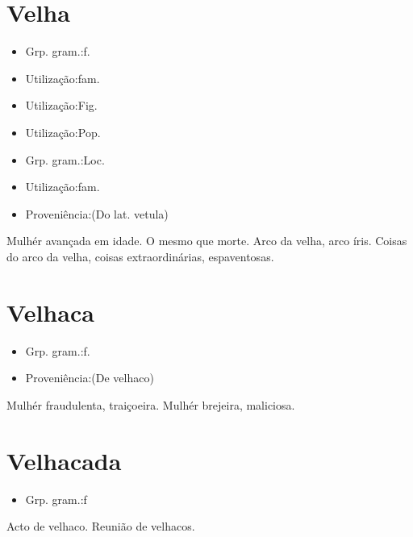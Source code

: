\documentclass{article}
\begin{document}
\section{Velha}
\begin{itemize}
\item {Grp. gram.:f.}
\end{itemize}
\begin{itemize}
\item {Utilização:fam.}
\end{itemize}
\begin{itemize}
\item {Utilização:Fig.}
\end{itemize}
\begin{itemize}
\item {Utilização:Pop.}
\end{itemize}
\begin{itemize}
\item {Grp. gram.:Loc.}
\end{itemize}
\begin{itemize}
\item {Utilização:fam.}
\end{itemize}
\begin{itemize}
\item {Proveniência:(Do lat. \textunderscore vetula\textunderscore )}
\end{itemize}
Mulhér avançada em idade.
O mesmo que \textunderscore morte\textunderscore .
\textunderscore Arco da velha\textunderscore , arco íris.
\textunderscore Coisas do arco da velha\textunderscore , coisas extraordinárias, espaventosas.
\section{Velhaca}
\begin{itemize}
\item {Grp. gram.:f.}
\end{itemize}
\begin{itemize}
\item {Proveniência:(De \textunderscore velhaco\textunderscore )}
\end{itemize}
Mulhér fraudulenta, traiçoeira.
Mulhér brejeira, maliciosa.
\section{Velhacada}
\begin{itemize}
\item {Grp. gram.:f}
\end{itemize}
Acto de velhaco.
Reunião de velhacos.
\end{document}
